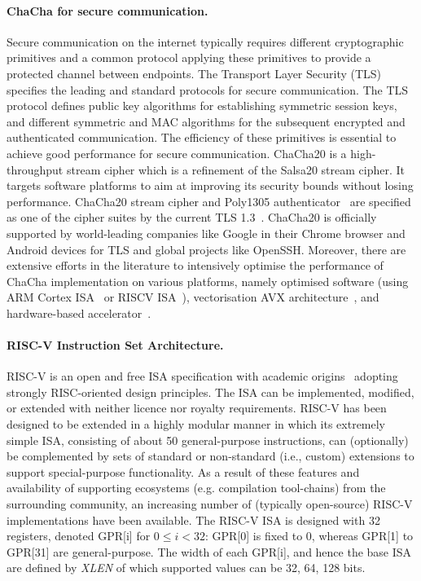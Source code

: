 \paragraph{ChaCha for secure communication.}
Secure communication on the internet typically requires different cryptographic primitives and a common protocol applying these primitives to provide a protected channel between endpoints.
The Transport Layer Security (TLS) specifies the leading and standard protocols for secure communication.
The TLS protocol defines public key algorithms for establishing symmetric session keys, and different symmetric and MAC algorithms for the subsequent encrypted and authenticated communication.
The efficiency of these primitives is essential to achieve good performance for secure communication.
ChaCha20 is a high-throughput stream cipher which is a refinement of the Salsa20 stream cipher. It targets software platforms to aim at improving its security bounds without losing performance. ChaCha20 stream cipher and Poly1305 authenticator~\cite{RFC:16} are specified as one of the cipher suites by the current TLS 1.3~\cite[Section 9.1]{RFC:18:8446}.
ChaCha20 is officially supported by world-leading companies like Google in their Chrome browser and Android devices for TLS and global projects like OpenSSH.
Moreover, there are extensive efforts in the literature to intensively optimise the performance of ChaCha implementation on various platforms, namely optimised software (using ARM Cortex ISA~\cite{SSS:17} or RISCV ISA~\cite{Sto:19}), vectorisation AVX architecture~\cite{GolGue:14}, and hardware-based accelerator~\cite{KLA:19}.  

\paragraph{RISC-V Instruction Set Architecture.}
RISC-V is an open and free ISA specification with academic origins~\cite{riscv:14} adopting strongly RISC-oriented design principles. 
The ISA can be implemented, modified, or extended with neither licence nor royalty requirements.
RISC-V has been designed to be extended in a highly modular manner 
in which its extremely simple ISA, consisting of about 50 general-purpose instructions, can (optionally) be complemented by sets of
standard or non-standard (i.e., custom) extensions to support special-purpose functionality.
As a result of these features and availability of supporting ecosystems (e.g. compilation tool-chains) from the surrounding community,
an increasing number of (typically open-source) RISC-V implementations have been available.
The RISC-V ISA is designed with 32 registers, denoted GPR[i] for $0 \le i < 32$: GPR[0] is fixed to 0, whereas GPR[1] to GPR[31] are general-purpose. 
The width of each GPR[i], and hence the base ISA are defined by \emph{XLEN} of which supported values can be 32, 64, 128 bits. 

